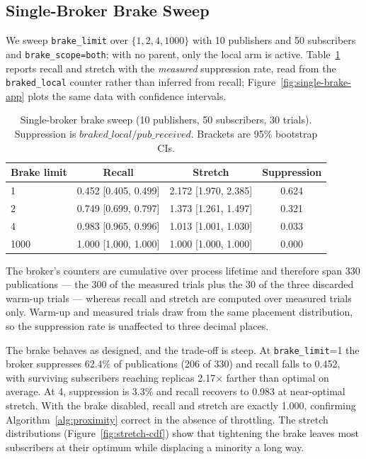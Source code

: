 \documentclass[10pt]{article}
\begin{document}
\subsection{Single-Broker Brake Sweep}
\label{sec:single-brake}

We sweep \texttt{brake\_limit} over $\{1,2,4,1000\}$ with 10 publishers and 50 subscribers and \texttt{brake\_scope=both}; with no parent, only the local arm is active. Table~\ref{tab:brake-sweep} reports recall and stretch with the \emph{measured} suppression rate, read from the \texttt{braked\_local} counter rather than inferred from recall; Figure~\ref{fig:single-brake-app} plots the same data with confidence intervals.

\begin{table}[t]
\centering
\caption{Single-broker brake sweep (10 publishers, 50 subscribers, 30 trials). Suppression is $\textit{braked\_local}/\textit{pub\_received}$. Brackets are 95\% bootstrap CIs.}
\label{tab:brake-sweep}
\begin{tabular}{lccc}
\toprule
Brake limit & Recall & Stretch & Suppression \\
\midrule
1    & 0.452 [0.405, 0.499] & 2.172 [1.970, 2.385] & 0.624 \\
2    & 0.749 [0.699, 0.797] & 1.373 [1.261, 1.497] & 0.321 \\
4    & 0.983 [0.965, 0.996] & 1.013 [1.001, 1.030] & 0.033 \\
1000 & 1.000 [1.000, 1.000] & 1.000 [1.000, 1.000] & 0.000 \\
\bottomrule
\end{tabular}

\vspace{3pt}
\parbox{0.93\textwidth}{\footnotesize The broker's counters are cumulative over process lifetime and therefore span 330 publications --- the 300 of the measured trials plus the 30 of the three discarded warm-up trials --- whereas recall and stretch are computed over measured trials only. Warm-up and measured trials draw from the same placement distribution, so the suppression rate is unaffected to three decimal places.}
\end{table}

The brake behaves as designed, and the trade-off is steep. At \texttt{brake\_limit}=1 the broker suppresses 62.4\% of publications (206 of 330) and recall falls to 0.452, with surviving subscribers reaching replicas 2.17$\times$ farther than optimal on average. At 4, suppression is 3.3\% and recall recovers to 0.983 at near-optimal stretch. With the brake disabled, recall and stretch are exactly 1.000, confirming Algorithm~\ref{alg:proximity} correct in the absence of throttling. The stretch distributions (Figure~\ref{fig:stretch-cdf}) show that tightening the brake leaves most subscribers at their optimum while displacing a minority a long way.
\end{document}
